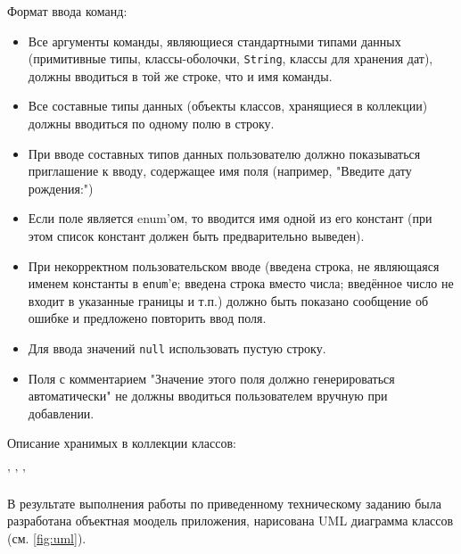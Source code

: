 \noindent
Формат ввода команд:
\begin{itemize}
\setlength{\itemsep}{0pt}
    \setlength{\parskip}{0pt}
    \setlength{\parsep}{0pt}
\item Все аргументы команды, являющиеся стандартными типами данных (примитивные типы, классы-оболочки, \verb|String|, классы для хранения дат), должны вводиться в той же строке, что и имя команды.
\item Все составные типы данных (объекты классов, хранящиеся в коллекции) должны вводиться по одному полю в строку.
\item При вводе составных типов данных пользователю должно показываться приглашение к вводу, содержащее имя поля (например, "Введите дату рождения:")
\item Если поле является enum'ом, то вводится имя одной из его констант (при этом список констант должен быть предварительно выведен).
\item При некорректном пользовательском вводе (введена строка, не являющаяся именем константы в \verb|enum|'е; введена строка вместо числа; введённое число не входит в указанные границы и т.п.) должно быть показано сообщение об ошибке и предложено повторить ввод поля.
\item Для ввода значений \verb|null| использовать пустую строку.
\item Поля с комментарием "Значение этого поля должно генерироваться автоматически" не должны вводиться пользователем вручную при добавлении.
\end{itemize}

\noindent
Описание хранимых в коллекции классов:
\begin{figure}[h] %
    \begin{center}
        
    \end{center}
    \label{lst:objects}
\end{figure}

\begin{center}
    ' ' '
\end{center}

\newpage
{}
В результате выполнения работы по приведенному техническому заданию была разработана объектная моодель приложения, нарисована UML диаграмма классов (см. \ref{fig:uml}).



